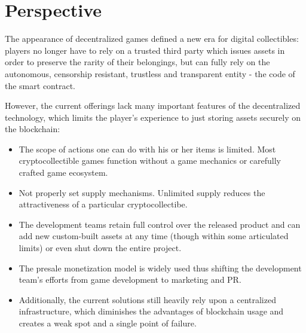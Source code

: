 \documentclass[12pt]{article}
\begin{document}
\newpage
\par


\vspace{\baselineskip}



\tableofcontents

\vspace{\baselineskip}



\newpage

\vspace{\baselineskip}\section{Perspective}
The appearance of decentralized games defined a new era for digital collectibles: players no longer have to rely on a trusted third party which issues assets in order to preserve the rarity of their belongings, but can fully rely on the autonomous, censorship resistant, trustless and transparent entity - the code of the smart contract.\par

However, the current offerings lack many important features of the decentralized \mbox{technology}, which limits the player’s experience to just storing assets securely on the blockchain:\par

\begin{itemize}
	\item The scope of actions one can do with his or her items is limited. Most cryptocollectible games function without a game mechanics or carefully crafted game ecosystem.\par

	\item Not properly set supply mechanisms. Unlimited supply reduces the attractiveness of a particular cryptocollectibe.\par

	\item The development teams retain full control over the released product and can add new custom-built assets at any time (though within some articulated limits) or even shut down the entire project.\par

	\item The presale monetization model is widely used thus shifting the development team’s efforts from game development to marketing and PR.\par

	\item Additionally, the current solutions still heavily rely upon a centralized infrastructure, which diminishes the advantages of blockchain usage and creates a weak spot and a single point of failure.
\end{itemize}\par
\end{document}
